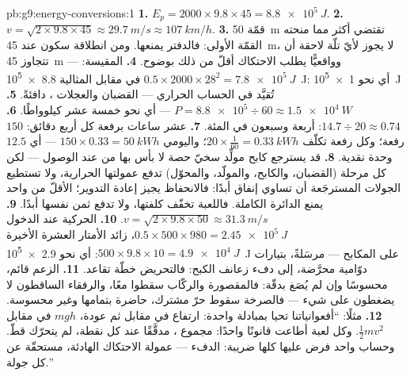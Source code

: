 \begin{solution}{pb:g9:energy-conversions:1}
\textbf{1.} $E_p = 2000 \times 9.8 \times 45 =
\qty{8.8e5}{J}$.
\textbf{2.} $v = \sqrt{2 \times 9.8 \times 45} \approx
\qty{29.7}{m/s} \approx \qty{107}{km/h}$.
\textbf{3.} قمّة \qty{50}{m} تقتضي  أكثر مما منحته
القمّة الأولى: فالدفتر يمنعها. ومن انطلاقة سكون عند
\qty{45}{m}، لا يجوز لأيّ تلّة لاحقة أن تتجاوز \qty{45}{m}
--- وواقعيًّا يطلب الاحتكاك أقلّ من ذلك بوضوح.
\textbf{4.} المقيسة: $0.5 \times 2000 \times 28^2 =
\qty{7.8e5}{J}$ في مقابل المثالية \qty{8.8e5}{J}: أي نحو
\qty{1e5}{J} تُقيَّد في الحساب الحراري --- القضبان والعجلات
، دافئةً.
\textbf{5.} $P = \num{8.8e5} \div 60 \approx \qty{1.5e4}{W}$
--- أي نحو خمسة عشر كيلوواطًا.
\textbf{6.} $14.7 \div 20 \approx 0.74$: أربعة وسبعون في
المئة.
\textbf{7.} عشر ساعات برفعة كل أربع دقائق: $150$ رفعة؛ وكل
رفعة تكلّف $20 \times \tfrac{1}{60} = \qty{0.33}{kWh}$؛
واليومي $150 \times 0.33 = \qty{50}{kWh}$ --- أي $12.5$ وحدة
نقدية.
\textbf{8.} قد يسترجع كابح مولِّد سخيّ حصة لا بأس بها من
 عند الوصول --- لكن كل مرحلة (القضبان،
والكابح، والمولّد، والمحوّل) تدفع عمولتها الحرارية، ولا
تستطيع الجولات المسترجَعة أن تساوي إنفاق  أبدًا:
فالانحفاظ يجيز إعادة التدوير؛  الأقلّ من واحد يمنع
الدائرة الكاملة. فاللعبة تخفّف كلفتها، ولا تدفع ثمن نفسها
أبدًا.
\textbf{9.} $v = \sqrt{2 \times 9.8 \times 50} \approx
\qty{31.3}{m/s}$.
\textbf{10.} الحركية عند الدخول $0.5 \times 500 \times 980 =
\qty{2.45e5}{J}$، زائد الأمتار العشرة الأخيرة
$500 \times 9.8 \times 10 = \qty{4.9e4}{J}$: أي نحو
\qty{2.9e5}{J} على المكابح --- مرسَلةً، بتيارات دوّامية
محرَّضة، إلى دفء زعانف الكبح: فالتحريض خطّة تقاعد.
\textbf{11.} الزعم قائم، محسوسًا وإن لم يُصَغ بدقّة: فالمقصورة
والركّاب سقطوا معًا، والرفقاء الساقطون لا يضغطون على شيء ---
فالصرخة سقوط حرّ مشترك،  حاضرة بتمامها وغير محسوسة.
\textbf{12.} مثلًا: ``أفعوانياتنا تحيا بمبادلة واحدة:
ارتفاع في مقابل  ثم عودة، $m g h$ في مقابل
$\frac12 m v^2$. وكل لعبة أطاعت قانونًا واحدًا: مجموع
، مدقَّقًا عند كل نقطة، لم يتحرّك قطّ. وحساب واحد فرض
عليها كلها ضريبة: الدفء --- عمولة الاحتكاك الهادئة، مستحقّة
عن كل جولة.''
\end{solution}
